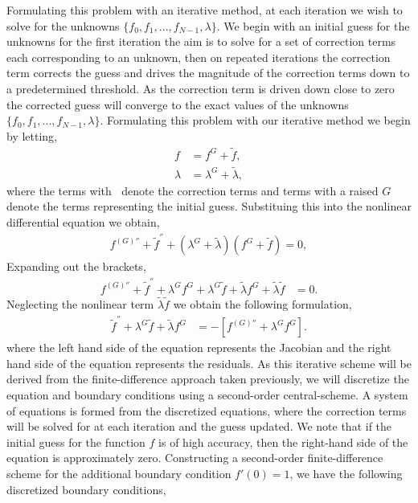 \documentclass[a4paper, 12pt, twoside, openright]{article}
\numberwithin{equation}{section}
\begin{document}
Formulating this problem with an iterative method, at each iteration we wish to solve for the unknowns $\{ f_0,f_1,...,f_{N-1},\lambda \}$. We begin with an initial guess for the unknowns for the first iteration the aim is to solve for a set of correction terms each corresponding to an unknown, then on repeated iterations the correction term corrects the guess and drives the magnitude of the correction terms down to a predetermined threshold. As the correction term is driven down close to zero the corrected guess will converge to the exact values of the unknowns $\{ f_0,f_1,...,f_{N-1},\lambda \}$. Formulating this problem with our iterative method we begin by letting,
\begin{align}
f &= f^{G} + \tilde f,\\
\lambda &= \lambda^{G} + \tilde \lambda,
\end{align}
where the terms with $~$ denote the correction terms and terms with a raised $G$ denote the terms representing the initial guess. Substituing this into the nonlinear differential equation we obtain,
\begin{align}
f^{(G)''}+\tilde f^{''} + (\lambda^{G}+\tilde \lambda)(f^{G}+\tilde f) = 0,
\end{align}
Expanding out the brackets,\\
\begin{align}
f^{(G)''} + \tilde f^{''} + \lambda^{G}f^{G} + \lambda^{G}\tilde f + \tilde \lambda f^{G} +  \tilde \lambda \tilde f &= 0.
\end{align} 
Neglecting the nonlinear term $\tilde \lambda \tilde f$ we obtain the following formulation,
\begin{align}
\tilde f^{''} + \lambda^{G}\tilde f + \tilde \lambda f^{G} &= - [f^{(G)''} + \lambda^{G}f^{G}]. \label{eq:oneD_iterative}
\end{align}
where the left hand side of the equation represents the Jacobian and the right hand side of the equation represents the residuals. As this iterative scheme will be derived from the finite-difference approach taken previously, we will discretize the equation and boundary conditions using a second-order central-scheme. A system of equations is formed from the discretized equations, where the correction terms will be solved for at each iteration and the guess updated. We note that if the initial guess for the function $f$ is of high accuracy, then the right-hand side of the equation is approximately zero. Constructing a second-order finite-difference scheme for the additional boundary condition $f'(0)=1$, we have the following discretized boundary conditions, 
\end{document}
